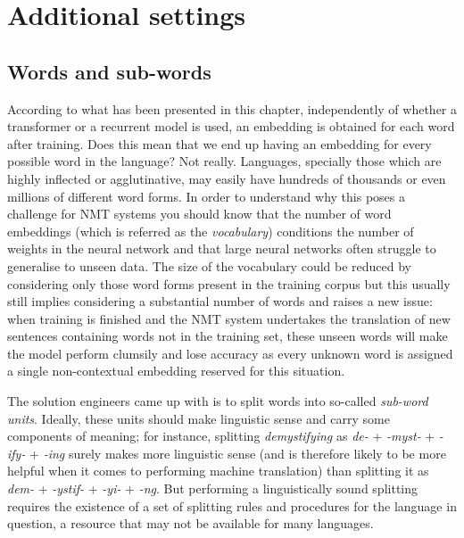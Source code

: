 \documentclass[output=paper,colorlinks,citecolor=brown]{langscibook}
\begin{document}
\section{Additional settings}

\subsection{Words and sub-words}

According to what has been presented in this chapter, independently of whether a transformer or a recurrent model is used, an embedding is obtained for each word after training. Does 
this
mean that we end up having an embedding for every possible word in the language? Not really. Languages, specially those which are highly inflected or agglutinative, may easily have hundreds of thousands or even millions of different word forms. In order to understand why this poses a challenge for NMT systems you should know that the number of word embeddings (which is referred as the \emph{vocabulary}) conditions the number of weights in the neural network and that large neural networks often struggle to generalise to unseen data. The size of the vocabulary could be reduced by considering only those word forms present in the training corpus but this usually still
implies considering
a substantial number of words and raises a new issue: when training is finished and the NMT system undertakes the translation of new sentences containing words not in the training set, these unseen words will make the model perform clumsily and lose accuracy as every unknown word is assigned a single non-contextual embedding reserved for this situation.

The solution engineers came up with is to split words into so-called \emph{sub-word units}. 
Ideally, these units should make linguistic sense and carry some components of meaning; for instance, splitting \emph{demystifying} as \emph{de-} + \emph{-myst-} + \emph{-ify-} + \emph{-ing} surely makes more linguistic sense (and is therefore likely to be more helpful when it comes to performing machine translation) than splitting it as \emph{dem-} + \emph{-ystif-} + \emph{-yi-} + \emph{-ng}. But performing a linguistically sound splitting requires the existence of a set of splitting rules and procedures for the language in question, a resource that may not be available for many languages.
\end{document}
